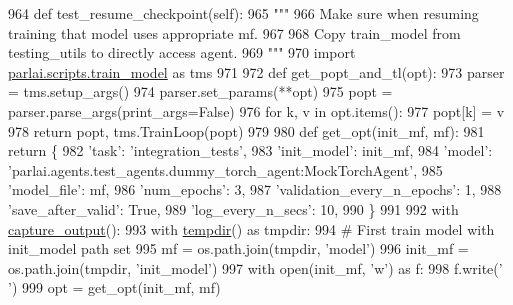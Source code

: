 \begin{DoxyCode}
964     \textcolor{keyword}{def }test\_resume\_checkpoint(self):
965         \textcolor{stringliteral}{"""}
966 \textcolor{stringliteral}{        Make sure when resuming training that model uses appropriate mf.}
967 \textcolor{stringliteral}{}
968 \textcolor{stringliteral}{        Copy train\_model from testing\_utils to directly access agent.}
969 \textcolor{stringliteral}{        """}
970         \textcolor{keyword}{import} \hyperlink{namespaceparlai_1_1scripts_1_1train__model}{parlai.scripts.train\_model} \textcolor{keyword}{as} tms
971 
972         \textcolor{keyword}{def }get\_popt\_and\_tl(opt):
973             parser = tms.setup\_args()
974             parser.set\_params(**opt)
975             popt = parser.parse\_args(print\_args=\textcolor{keyword}{False})
976             \textcolor{keywordflow}{for} k, v \textcolor{keywordflow}{in} opt.items():
977                 popt[k] = v
978             \textcolor{keywordflow}{return} popt, tms.TrainLoop(popt)
979 
980         \textcolor{keyword}{def }get\_opt(init\_mf, mf):
981             \textcolor{keywordflow}{return} \{
982                 \textcolor{stringliteral}{'task'}: \textcolor{stringliteral}{'integration\_tests'},
983                 \textcolor{stringliteral}{'init\_model'}: init\_mf,
984                 \textcolor{stringliteral}{'model'}: \textcolor{stringliteral}{'parlai.agents.test\_agents.dummy\_torch\_agent:MockTorchAgent'},
985                 \textcolor{stringliteral}{'model\_file'}: mf,
986                 \textcolor{stringliteral}{'num\_epochs'}: 3,
987                 \textcolor{stringliteral}{'validation\_every\_n\_epochs'}: 1,
988                 \textcolor{stringliteral}{'save\_after\_valid'}: \textcolor{keyword}{True},
989                 \textcolor{stringliteral}{'log\_every\_n\_secs'}: 10,
990             \}
991 
992         with \hyperlink{namespaceparlai_1_1utils_1_1testing_ab00d4d693202afab92c06387aa50699b}{capture\_output}():
993             with \hyperlink{namespaceparlai_1_1utils_1_1testing_a0945b769a10c0c844b29c02ff26445a5}{tempdir}() \textcolor{keyword}{as} tmpdir:
994                 \textcolor{comment}{# First train model with init\_model path set}
995                 mf = os.path.join(tmpdir, \textcolor{stringliteral}{'model'})
996                 init\_mf = os.path.join(tmpdir, \textcolor{stringliteral}{'init\_model'})
997                 with open(init\_mf, \textcolor{stringliteral}{'w'}) \textcolor{keyword}{as} f:
998                     f.write(\textcolor{stringliteral}{' '})
999                 opt = get\_opt(init\_mf, mf)

\end{DoxyCode}
